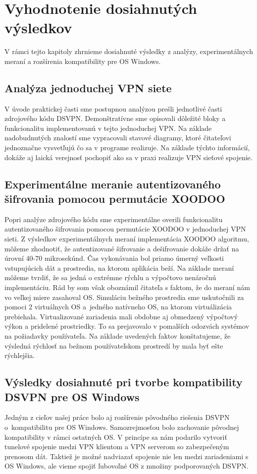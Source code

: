 \chapter{Vyhodnotenie dosiahnutých výsledkov}
V rámci tejto kapitoly zhrnieme dosiahnuté výsledky z analýzy, experimentálnych meraní a rozšírenia kompatibility pre OS Windows.
\section{Analýza jednoduchej VPN siete}
V úvode praktickej časti sme postupnou analýzou prešli jednotlivé časti zdrojového kódu DSVPN. Demonštratívne sme opisovali dôležité bloky a funkcionalitu implementovanú v tejto jednoduchej VPN. Na základe nadobudnutých znalostí sme vypracovali stavové diagramy, ktoré čitateľovi jednoznačne vysvetľujú čo sa v programe realizuje. Na základe týchto informácií, dokáže aj laická verejnosť pochopiť ako sa v praxi realizuje VPN sieťové spojenie.
\section{Experimentálne meranie autentizovaného šifrovania pomocou permutácie XOODOO}
Popri analýze zdrojového kódu sme experimentálne overili funkcionalitu autentizovaného šifrovania pomocou permutácie XOODOO v jednoduchej VPN sieti. Z výsledkov experimentálnych meraní implementácia XOODOO algoritmu, môžeme zhodnotiť, že autentizované šifrovanie a dešifrovanie dokáže držať na úrovní 40-70 mikrosekúnd. Čas vykonávania bol priamo úmerný veľkosti vstupujúcich dát a prostredia, na ktorom aplikácia beží. Na základe meraní môžeme tvrdiť, že sa jedná o extrémne rýchlu a výpočtovo nenáročnú implementáciu. Rád by som však oboznámil čitateľa s faktom, že do meraní nám vo veľkej miere zasahoval OS. Simuláciu bežného prostredia sme uskutočnili za pomoci 2 virtuálnych OS a~jedného natívneho OS, na ktorom virtuálizácia prebiehala. Virtualizované zariadenia mali obdobne aj obmedzený výpočtový výkon a pridelené prostriedky. To sa prejavovalo v pomalších odozvách systémov na požiadavky používateľa. Na základe uvedených faktov konštatujeme, že výsledná rýchlosť na bežnom používateľskom prostredí by mala byť ešte rýchlejšia.

\section{Výsledky dosiahnuté pri tvorbe kompatibility \\DSVPN pre OS Windows}
Jedným z cieľov našej práce bolo aj rozšírenie pôvodného riešenia DSVPN o~kompatibilitu pre OS Windows. Samozrejmosťou bolo zachovanie pôvodnej kompatibility v rámci ostatných OS. V princípe sa nám podarilo vytvoriť tunelové spojenie medzi VPN klientom a VPN serverom so zabezpečeným prenosom dát. Taktiež je možné nadviazať spojenie nie len medzi zariadeniami s OS Windows, ale vieme spojiť ľubovoľné OS z množiny podporovaných DSVPN.  

